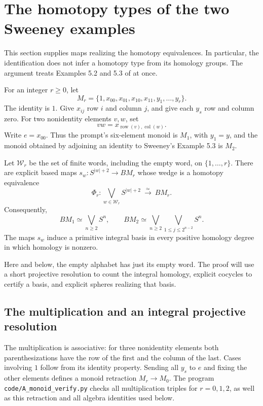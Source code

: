 \section{The homotopy types of the two Sweeney examples}\label{sec:monoids}

This section supplies maps realizing the homotopy equivalences.  In
particular, the identification does not infer a homotopy type from its
homology groups.  The argument treats Examples 5.2 and 5.3 of
\cite{Sweeney2025} at once.

\begin{definition}\label{def:Mr}
For an integer $r\geq 0$, let
\[
 M_r=\{1,x_{00},x_{01},x_{10},x_{11},y_1,\ldots,y_r\}.
\]
The identity is $1$.  Give $x_{ij}$ row $i$ and column $j$, and give each
$y_s$ row and column zero.  For two nonidentity elements $v,w$, set
\[
             vw=x_{\operatorname{row}(v),\operatorname{col}(w)}.
\]
Write $e=x_{00}$.  Thus the prompt's six-element monoid is $M_1$, with
$y_1=y$, and the monoid obtained by adjoining an identity to Sweeney's
Example 5.3 is $M_2$.
\end{definition}

\begin{theorem}\label{thm:Mr-wedge}
Let $\mathcal W_r$ be the set of finite words, including the empty word,
on $\{1,\ldots,r\}$.  There are explicit based maps
$s_w:S^{|w|+2}\longrightarrow BM_r$ whose wedge is a homotopy equivalence
\[
 \Phi_r:\bigvee_{w\in\mathcal W_r}S^{|w|+2}\ \xrightarrow{\simeq}\ BM_r.
 \tag{A*}\label{eq:Mr-wedge}
\]
Consequently,
\[
 BM_1\simeq\bigvee_{n\geq2}S^n,
 \qquad
 BM_2\simeq\bigvee_{n\geq2}\bigvee_{1\leq j\leq2^{n-2}}S^n.
\]
The maps $s_w$ induce a primitive integral basis in every positive
homology degree in which homology is nonzero.
\end{theorem}

Here and below, the empty alphabet has just its empty word.  The proof
will use a short projective resolution to count the integral homology,
explicit cocycles to certify a basis, and explicit spheres realizing
that basis.

\subsection{The multiplication and an integral projective resolution}

The multiplication is associative: for three nonidentity elements both
parenthesizations have the row of the first and the column of the last.
Cases involving $1$ follow from its identity property.  Sending all
$y_s$ to $e$ and fixing the other elements defines a monoid retraction
$M_r\to M_0$.  The program
\texttt{code/A\_monoid\_verify.py} checks all multiplication triples for
$r=0,1,2$, as well as this retraction and all algebra identities used
below.

